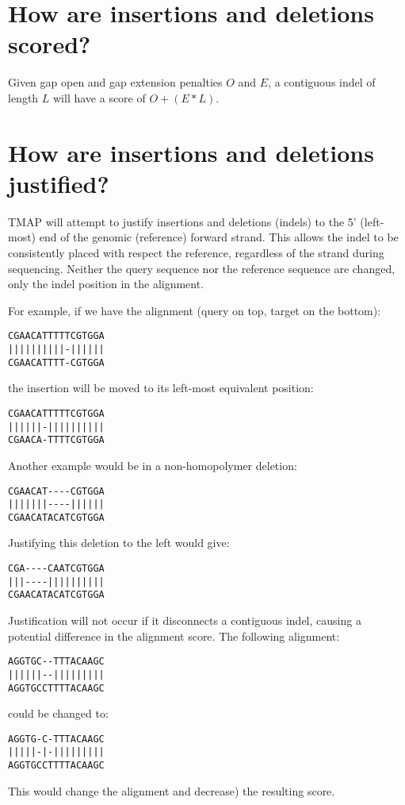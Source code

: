 \documentclass[a4paper,12pt]{book}
\begin{document}
\section{How are insertions and deletions scored?}
\label{sec:indel-scoring}
Given gap open and gap extension penalties $O$ and $E$, a contiguous indel of length $L$ will have a score of $O + (E * L)$.

\section{How are insertions and deletions justified?}
\label{sec:indel-justification}
TMAP will attempt to justify insertions and deletions (indels) to the 5' (left-most) end of the genomic (reference) forward strand.
This allows the indel to be consistently placed with respect the reference, regardless of the strand during sequencing.
Neither the query sequence nor the reference sequence are changed, only the indel position in the alignment.

For example, if we have the alignment (query on top, target on the bottom):
\begin{verbatim}
CGAACATTTTTCGTGGA
||||||||||-||||||
CGAACATTTT-CGTGGA
\end{verbatim}
the insertion will be moved to its left-most equivalent position:
\begin{verbatim}
CGAACATTTTTCGTGGA
||||||-||||||||||
CGAACA-TTTTCGTGGA
\end{verbatim}
Another example would be in a non-homopolymer deletion: 
\begin{verbatim}
CGAACAT----CGTGGA
|||||||----||||||
CGAACATACATCGTGGA
\end{verbatim}
Justifying this deletion to the left would give:
\begin{verbatim}
CGA----CAATCGTGGA
|||----||||||||||
CGAACATACATCGTGGA
\end{verbatim}
Justification will not occur if it disconnects a contiguous indel, causing a potential difference in the alignment score.
The following alignment:
\begin{verbatim}
AGGTGC--TTTACAAGC
||||||--|||||||||
AGGTGCCTTTTACAAGC
\end{verbatim}
could be changed to: 
\begin{verbatim}
AGGTG-C-TTTACAAGC
|||||-|-|||||||||
AGGTGCCTTTTACAAGC
\end{verbatim}
This would change the alignment and decrease) the resulting score.
\end{document}
